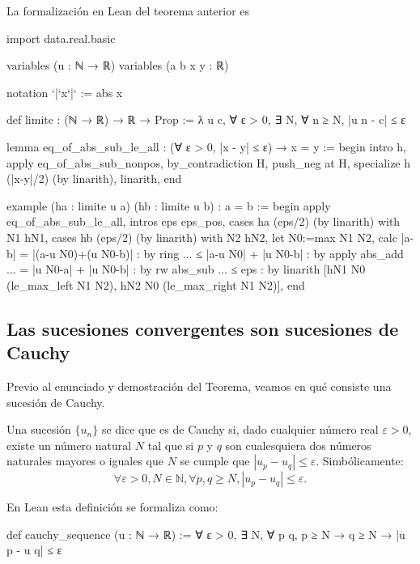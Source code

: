 La formalización en Lean del teorema anterior es
\begin{leancode}
import data.real.basic

variables (u : ℕ → ℝ)
variables (a b x y : ℝ)

notation `|`x`|` := abs x

def limite : (ℕ → ℝ) → ℝ → Prop :=
λ u c, ∀ ε > 0, ∃ N, ∀ n ≥ N, |u n - c| ≤ ε

lemma eq_of_abs_sub_le_all
  : (∀ ε > 0, |x - y| ≤ ε) → x = y :=
begin
  intro h,
  apply eq_of_abs_sub_nonpos,
  by_contradiction H,
  push_neg at H,
  specialize h (|x-y|/2) (by linarith),
  linarith,
end

example
  (ha : limite u a)
  (hb : limite u b)
  : a = b :=
begin
  apply eq_of_abs_sub_le_all,
  intros eps eps_pos,
  cases ha (eps/2) (by linarith) with N1 hN1,
  cases hb (eps/2) (by linarith) with N2 hN2,
  let N0:=max N1 N2,
  calc  |a-b|
      = |(a-u N0)+(u N0-b)| : by ring
  ... ≤ |a-u N0| + |u N0-b| : by apply abs_add
  ... = |u N0-a| + |u N0-b| : by rw abs_sub
  ... ≤ eps                 : by linarith [hN1 N0 (le_max_left N1 N2),
                                           hN2 N0 (le_max_right N1 N2)],
end
\end{leancode}

\subsection{Las sucesiones convergentes son sucesiones de Cauchy}

Previo al enunciado y demostración del Teorema, veamos en qué consiste
una sucesión de Cauchy.

\begin{definicion}
  Una sucesión \(\{u_n\}\) se dice que es de Cauchy si, dado cualquier
  número real \(ε > 0\), existe un número natural \(N\) tal que si \(p\)
  y \(q\) son cualesquiera dos números naturales mayores o iguales que
  \(N\) se cumple que \(|u_p - u_q| ≤ ε\). Simbólicamente:
  \begin{equation}
  ∀ ε > 0, N ∈ ℕ, ∀ p, q ≥ N, |u_p - u_q| ≤ ε.
  \end{equation}
\end{definicion}

En Lean esta definición se formaliza como:
\begin{leancode}
def cauchy_sequence (u : ℕ → ℝ) :=
∀ ε > 0, ∃ N, ∀ p q, p ≥ N → q ≥ N → |u p - u q| ≤ ε
\end{leancode}

